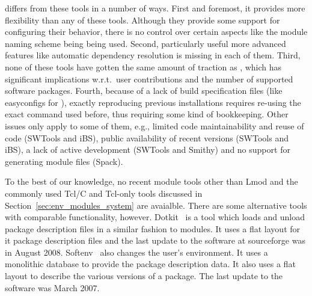 \easybuild{} differs from these tools in a number of ways. First and foremost, it
provides more flexibility than any of these tools. Although they provide some support
for configuring their behavior, there is no control over certain aspects like the
module naming scheme being being used. Second, particularly useful more advanced
features like automatic dependency resolution is missing in each of them. Third, none
of these tools have gotten the same amount of traction as \easybuild{}, which has
significant implications w.r.t.\ user contributions and the number of supported
software packages. Fourth, because of a lack of build specification files (like
easyconfigs for \easybuild{}), exactly reproducing previous installations requires
re-using the exact command used before, thus requiring some kind of bookkeeping.
Other issues only apply to some of them, e.g., limited code
maintainability and reuse of code (SWTools and iBS), public availability of recent
versions (SWTools and iBS), a lack of active development (SWTools and Smithy) and
no support for generating module files (Spack).

To the best of our knowledge, no recent module tools other than Lmod and the commonly
used Tcl/C and Tcl-only tools discussed in Section~\ref{sec:env_modules_system} are
avaialble. There are some alternative tools with comparable functionality, however.
Dotkit~\cite{dotkit} is a tool which loads and unload package description files in 
a similar fashion to modules. It uses a flat layout for it package description files 
and the last update to the software at sourceforge was in August 2008.
Softenv~\cite{softenv} also changes the user's environment. It uses a
monolithic database to provide the package description data.  It also
uses a flat layout to describe the various versions of a package.  The
last update to the software was March 2007.


